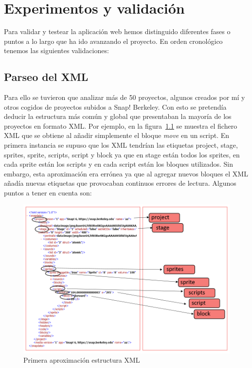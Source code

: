 \documentclass[a4paper, 12pt]{book}
\begin{document}
\cleardoublepage
\chapter{Experimentos y validación}


Para validar y testear la aplicación web hemos distinguido diferentes fases o puntos a lo largo que ha ido avanzando el proyecto. En orden cronológico tenemos las siguientes validaciones:
\section{Parseo del XML}
Para ello se tuvieron que analizar más de 50 proyectos, algunos creados por mí y otros cogidos de proyectos subidos a Snap! Berkeley. Con esto se pretendía deducir la estructura más común y global que presentaban la mayoría de los proyectos en formato XML. Por ejemplo, en la figura~\ref{figura:xml-1} se muestra el fichero XML que se obtiene al añadir simplemente el bloque \textit{move} en un script. En primera instancia se supuso que los XML tendrían las etiquetas project, stage, sprites, sprite, scripts, script y block ya que en stage están todos los sprites, en cada sprite están los scripts y en cada script están los bloques utilizados. Sin embargo, esta aproximación era errónea ya que al agregar nuevos bloques el XML añadía nuevas etiquetas que provocaban continuos errores de lectura. Algunos puntos a tener en cuenta son:
\begin{figure}[h]
            \centering
            \includegraphics[scale=0.6]{img/xml_val.PNG}
            \caption{Primera aproximación estructura XML}
            \label{figura:xml-1}
        \end{figure}
        
\end{document}
